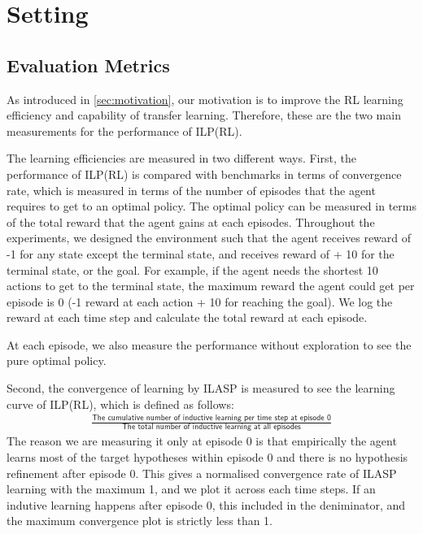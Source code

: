 \section{Setting}
\label{sec:setting}

\subsection{Evaluation Metrics}
\label{subsec:evaluation_metrics}

As introduced in \ref{sec:motivation}, our motivation is to improve the RL learning efficiency and capability of transfer learning.
Therefore, these are the two main measurements for the performance of ILP(RL).

The learning efficiencies are measured in two different ways. First, the performance of ILP(RL) is compared with benchmarks in terms of
convergence rate, which is measured in terms of the number of episodes that the agent requires to get to an optimal policy.
The optimal policy can be measured in terms of the total reward that the agent gains at each episodes. 
Throughout the experiments, we designed the environment such that the agent receives reward of -1 for any state except the terminal state, and receives reward of + 10 for the terminal state, or the goal.
For example, if the agent needs the shortest 10 actions to get to the terminal state, the maximum reward the agent could get per episode is 0 (-1 reward at each action + 10 for reaching the goal).
We log the reward at each time step and calculate the total reward at each episode. 

At each episode, we also measure the performance without exploration to see the pure optimal policy.

Second, the convergence of learning by ILASP is measured to see the learning curve of ILP(RL), which is defined as follows:
\begin{equation}
\begin{split}
\frac{\textsf{The cumulative number of inductive learning per time step at episode 0}}{\textsf{The total number of inductive learning at all episodes}}
\end{split}
\end{equation}
The reason we are measuring it only at episode 0 is that empirically the agent learns most of the target hypotheses within episode 0 and there is no hypothesis refinement after episode 0.
This gives a normalised convergence rate of ILASP learning with the maximum 1, and we plot it across each time steps. 
If an indutive learning happens after episode 0, this included in the deniminator, and the maximum convergence plot is strictly less than 1.

